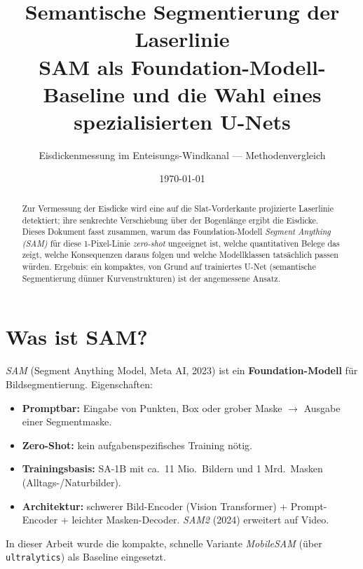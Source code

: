 \documentclass[11pt,a4paper]{article}
\title{\textbf{Semantische Segmentierung der Laserlinie}\\[2pt]
\large SAM als Foundation-Modell-Baseline und die Wahl eines spezialisierten U-Nets}
\author{Eisdickenmessung im Enteisungs-Windkanal --- Methodenvergleich}
\date{\today}
\begin{document}
\maketitle

\begin{abstract}
\noindent
Zur Vermessung der Eisdicke wird eine auf die Slat-Vorderkante projizierte
Laserlinie detektiert; ihre senkrechte Verschiebung über der Bogenlänge ergibt
die Eisdicke. Dieses Dokument fasst zusammen, warum das Foundation-Modell
\emph{Segment Anything (SAM)} für diese 1-Pixel-Linie \emph{zero-shot} ungeeignet
ist, welche quantitativen Belege das zeigt, welche Konsequenzen daraus folgen und
welche Modellklassen tatsächlich passen würden. Ergebnis: ein kompaktes, von Grund
auf trainiertes U-Net (semantische Segmentierung dünner Kurvenstrukturen) ist der
angemessene Ansatz.
\end{abstract}

\section{Was ist SAM?}
\emph{SAM} (Segment Anything Model, Meta AI, 2023) ist ein \textbf{Foundation-Modell}
für Bildsegmentierung. Eigenschaften:
\begin{itemize}
  \item \textbf{Promptbar:} Eingabe von Punkten, Box oder grober Maske $\rightarrow$
        Ausgabe einer Segmentmaske.
  \item \textbf{Zero-Shot:} kein aufgabenspezifisches Training nötig.
  \item \textbf{Trainingsbasis:} SA-1B mit ca.\ 11 Mio.\ Bildern und 1 Mrd.\ Masken
        (Alltags-/Naturbilder).
  \item \textbf{Architektur:} schwerer Bild-Encoder (Vision Transformer) +
        Prompt-Encoder + leichter Masken-Decoder. \emph{SAM2} (2024) erweitert auf Video.
\end{itemize}
In dieser Arbeit wurde die kompakte, schnelle Variante \emph{MobileSAM} (über
\texttt{ultralytics}) als Baseline eingesetzt.
\end{document}
